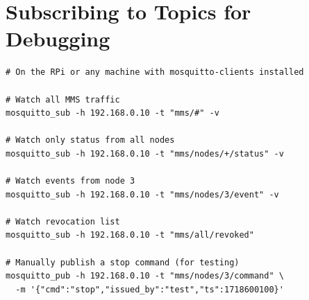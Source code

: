 \section{Subscribing to Topics for Debugging}

\begin{lstlisting}[style=bashstyle]
# On the RPi or any machine with mosquitto-clients installed

# Watch all MMS traffic
mosquitto_sub -h 192.168.0.10 -t "mms/#" -v

# Watch only status from all nodes
mosquitto_sub -h 192.168.0.10 -t "mms/nodes/+/status" -v

# Watch events from node 3
mosquitto_sub -h 192.168.0.10 -t "mms/nodes/3/event" -v

# Watch revocation list
mosquitto_sub -h 192.168.0.10 -t "mms/all/revoked"

# Manually publish a stop command (for testing)
mosquitto_pub -h 192.168.0.10 -t "mms/nodes/3/command" \
  -m '{"cmd":"stop","issued_by":"test","ts":1718600100}'
\end{lstlisting}

